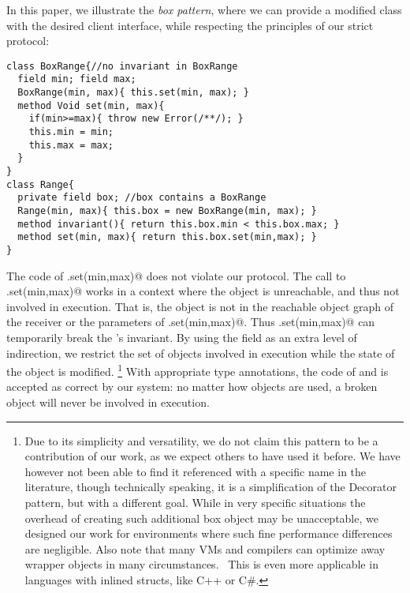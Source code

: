 In this paper, we illustrate the \emph{box pattern}, where we can provide a modified
\Q@Range@ class with the desired client interface, while respecting the principles of our strict protocol:
\begin{lstlisting}
class BoxRange{//no invariant in BoxRange
  field min; field max;
  BoxRange(min, max){ this.set(min, max); }
  method Void set(min, max){
    if(min>=max){ throw new Error(/**/); }
    this.min = min;
    this.max = max;
  }
}
class Range{
  private field box; //box contains a BoxRange
  Range(min, max){ this.box = new BoxRange(min, max); }
  method invariant(){ return this.box.min < this.box.max; }
  method set(min, max){ return this.box.set(min,max); }
}
\end{lstlisting}
The code of \Q@Range.set(min,max)@ does not violate our protocol.
The call to
\Q@BoxRange.set(min,max)@ works in a context where the \Q@Range@ object is
unreachable, and thus not involved in execution.
That is, the \Q@Range@ object is not in the reachable object graph of the receiver or the parameters of \Q@BoxRange.set(min,max)@.
 Thus \Q@Range.set(min,max)@ can temporarily break the \Q@Range@'s invariant.
By using the \Q@box@ field as an extra level of indirection, we restrict the set of objects involved in execution while the state of the object \Q@Range@ is modified.%
\footnote{Due to its simplicity and versatility, we do not claim this pattern to be a contribution of our work, as we expect others to have used it before. We have however not been able to find it referenced with a specific name in the literature, though technically speaking, it is a simplification of the Decorator pattern, but with a different goal.
While in very specific situations the overhead of creating such additional box object may be unacceptable, we designed our work for environments where such fine performance differences are negligible.
Also note that many VMs and compilers can optimize away wrapper objects in many circumstances.~\cite{Bolz:2011:ARP:1929501.1929508}
This is even more applicable in languages with inlined structs, like C++ or C\#.
}
With appropriate type annotations, the code of \Q@Range@ and \Q@BoxRange@ is accepted as correct by our system: no matter how \Q@Range@ objects are used, a broken \Q@Range@ object will never be involved in execution.

